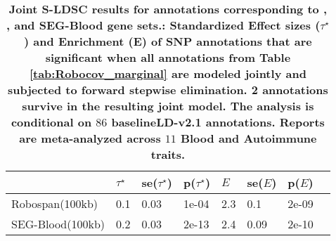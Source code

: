 \newpage
\begin{table}[h]
\caption{\bf{Joint S-LDSC results for annotations corresponding to \Robospan{}, \pRobospan{}, \Corspan{} and SEG-Blood gene sets.}: Standardized Effect sizes ($\tau^{\star}$) and Enrichment (E) of  SNP annotations that are significant when all annotations from Table \ref{tab:Robocov_marginal} are modeled jointly and subjected to forward stepwise elimination. 2 annotations survive in the resulting joint model. The analysis is conditional on $86$ baselineLD-v2.1 annotations. Reports are meta-analyzed across $11$ Blood and Autoimmune traits.}
\label{tab:Robocov_joint} 
\begin{tabular}[c]{|p{2.1cm}|p{0.6cm}|p{0.7cm}|p{0.8cm}|p{0.7cm}|p{0.7cm}|p{0.8cm}|p{0.8cm}|} \hline
 & $\tau^{\star}$ & se($\tau^{\star}$) & p($\tau^{\star}$) & $E$ & se($E$) & p($E$) \\
\hline
\multirow{1}{16em}{Robospan(100kb)} & 0.1 & 0.03 & 1e-04 & 2.3 & 0.1 & 2e-09 \\
\multirow{1}{16em}{SEG-Blood(100kb)} & 0.2 & 0.03 & 2e-13 & 2.4 & 0.09 & 2e-10 \\
\hline 
\end{tabular}
\end{table}